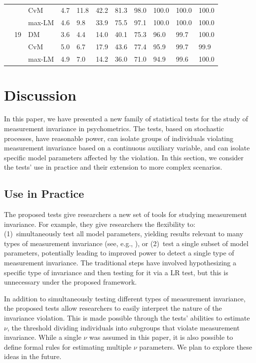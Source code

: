 \documentclass[man]{apa}
\begin{document}
\begin{table}
\begin{center}
\begin{tabular}{lllllllllll}
         &         &  CvM            &  4.7 &   11.8 &   42.2 &   81.3 &   98.0 &  100.0  & 100.0 &  100.0 \\ 
         &         &  max-LM          &  4.6 &    9.8 &   33.9 &   75.5 &   97.1 &  100.0  & 100.0 &  100.0 \\ 
         &  19   &  DM           &  3.6 &    4.4 &   14.0 &   40.1 &   75.3 &   96.0  &  99.7 &  100.0 \\ 
         &         &  CvM            &  5.0 &    6.7 &   17.9 &   43.6 &   77.4 &   95.9  &  99.7 &   99.9 \\ 
         &         &  max-LM          &  4.9 &    7.0 &   14.2 &   36.0 &   71.0 &   94.9  &  99.6 &  100.0 \\ 
   \hline
\end{tabular}
\end{center}
\end{table}


\section{Discussion}
In this paper, we have presented a new family of statistical tests for
the study of measurement invariance in psychometrics.  The tests,
based on stochastic processes, have reasonable power, can isolate
groups of individuals violating measurement invariance based on a
continuous auxiliary variable, and can
isolate specific model parameters affected by the violation.  In this
section, we consider the tests' use in practice and their 
extension to more complex scenarios.

\subsection{Use in Practice}
The proposed tests give researchers a new set of tools for studying 
measurement invariance.  For example, they give researchers the
flexibility to: (1)~simultaneously test all model parameters, yielding
results relevant to many types of measurement
invariance (see, e.g., ), or (2)~test a single subset of
model parameters, potentially leading to improved power to detect a
single type of measurement invariance.  The traditional
steps have involved hypothesizing a specific type of invariance and
then testing for it via a LR test, but this is
unnecessary under the proposed framework.

In addition to simultaneously testing different types of measurement
invariance, the proposed tests allow researchers to easily interpret
the nature of the invariance violation.  This is made possible through
the tests' abilities to estimate $\nu$, the threshold dividing
individuals into subgroups that violate
measurement invariance.  While a single $\nu$ was assumed in this
paper, it is also possible to define 
formal rules for estimating multiple $\nu$ parameters.  We plan to
explore these ideas in the future.
\end{document}
